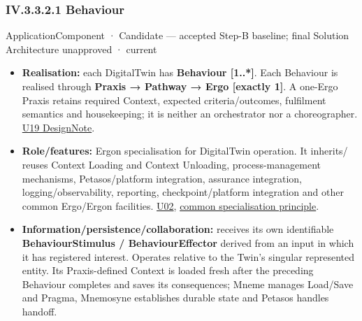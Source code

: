 \subsubsection*{IV.3.3.2.1 Behaviour}
\label{navigation:IV.3.3.2.1}

\label{element:a26f06d66bec4981b266e202c46a9afb}
{\small ApplicationComponent · Candidate — accepted Step-B baseline; final Solution Architecture unapproved · current}\par

\begin{itemize}


\item \textbf{Realisation:} each DigitalTwin has \textbf{Behaviour [1..*]}. Each Behaviour is
  realised through \textbf{Praxis → Pathway → Ergo [exactly 1]}. A one-Ergo Praxis
  retains required Context, expected criteria/outcomes, fulfilment semantics and
  housekeeping; it is neither an orchestrator nor a choreographer.
  \href{\detokenize{../../../../../../../../docs/markdown/05-information-systems-architecture/design-notes/DesignNote-Digital-Twin-Behaviour-and-Execution-Semantics.md}}{U19 DesignNote}.

\item \textbf{Role/features:} Ergon specialisation for DigitalTwin operation. It inherits/
  reuses Context Loading and Context Unloading, process-management mechanisms,
  Petasos/platform integration, assurance integration, logging/observability,
  reporting, checkpoint/platform integration and other common Ergo/Ergon facilities.
  \href{\detokenize{../../../../../../../../docs/markdown/05-information-systems-architecture/sources.md#u02}}{U02}, \href{\detokenize{../../../../../../../../docs/markdown/05-information-systems-architecture/README.md#specialisation-principle}}{common specialisation principle}.

\item \textbf{Information/persistence/collaboration:} receives its own identifiable
  \textbf{BehaviourStimulus / BehaviourEffector} derived from an input in which it has
  registered interest. Operates relative to the Twin's singular represented
  entity. Its Praxis-defined Context is loaded fresh after the preceding
  Behaviour completes and saves its consequences; Mneme manages Load/Save and
  Pragma, Mnemosyne establishes durable state and Petasos handles handoff.


\end{itemize}
